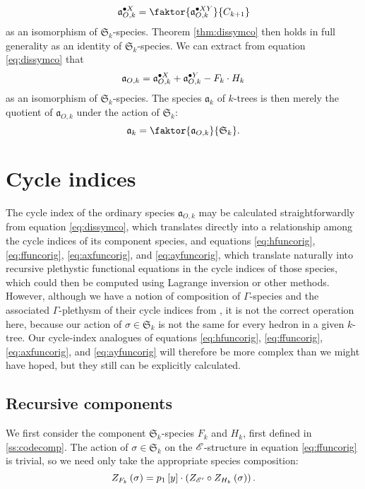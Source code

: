 \documentclass[sectionflow,singlespace,twoside,boldmathhdr]{brandiss} %
\numberwithin{section}{chapter}
\numberwithin{figure}{chapter}
\begin{document}
\begin{equation}
  \label{eq:cycquot}
  \pointed[X]{\mathfrak{a}}_{O, k} = \faktor{\pointed[XY]{\mathfrak{a}}_{O, k}}{C_{k+1}}
\end{equation}
as an isomorphism of $\mathfrak{S}_{k}$-species.
Theorem \ref{thm:dissymco} then holds in full generality as an identity of $\mathfrak{S}_{k}$-species.
We can extract from equation \eqref{eq:dissymco} that
\begin{equation}
  \label{eq:coskextract}
  \mathfrak{a}_{O, k} = \pointed[X]{\mathfrak{a}}_{O, k} + \pointed[Y]{\mathfrak{a}}_{O, k} - F_{k} \cdot H_{k}
\end{equation}
as an isomorphism of $\mathfrak{S}_{k}$-species.
The species $\mathfrak{a}_{k}$ of $k$-trees is then merely the quotient of $\mathfrak{a}_{O, k}$ under the action of $\mathfrak{S}_{k}$:
\begin{equation}
  \label{eq:ktreesquot}
  \mathfrak{a}_{k} = \faktor{\mathfrak{a}_{O, k}}{\mathfrak{S}_{k}}.
\end{equation}

\section{Cycle indices}\label{s:ktcycind}
The cycle index of the ordinary species $\mathfrak{a}_{O, k}$ may be calculated straightforwardly from equation \eqref{eq:dissymco}, which translates directly into a relationship among the cycle indices of its component species, and equations \eqref{eq:hfuncorig}, \eqref{eq:ffuncorig}, \eqref{eq:axfuncorig}, and \eqref{eq:ayfuncorig}, which translate naturally into recursive plethystic functional equations in the cycle indices of those species, which could then be computed using Lagrange inversion or other methods.
However, although we have a notion of composition of $\Gamma$-species and the associated $\Gamma$-plethysm of their cycle indices from \cite[\S 3]{hend:specfield}, it is not the correct operation here, because our action of $\sigma \in \mathfrak{S}_{k}$ is not the same for every hedron in a given $k$-tree.
Our cycle-index analogues of equations \eqref{eq:hfuncorig}, \eqref{eq:ffuncorig}, \eqref{eq:axfuncorig}, and \eqref{eq:ayfuncorig} will therefore be more complex than we might have hoped, but they still can be explicitly calculated.

\subsection{Recursive components}\label{ss:ktcycindrec}
We first consider the component $\mathfrak{S}_{k}$-species $F_{k}$ and $H_{k}$, first defined in \ref{ss:codecomp}.
The action of $\sigma \in \mathfrak{S}_{k}$ on the $\mathscr{E}$-structure in equation \eqref{eq:ffuncorig} is trivial, so we need only take the appropriate species composition:
\begin{equation}
  \label{eq:ffunc}
  Z_{F_{k}} \pbrac{\sigma} = p_{1} \sbrac{y} \cdot \pbrac{Z_{\specname{E}'} \circ Z_{H_{k}} \pbrac{\sigma}}.
\end{equation}
\end{document}
